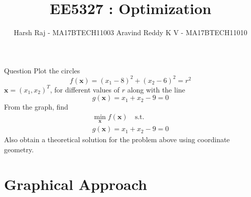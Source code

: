 \documentclass[10pt]{beamer}
\title{EE5327 : Optimization}
\date{}
\author{Harsh Raj - MA17BTECH11003 \newline Aravind Reddy K V - MA17BTECH11010}
\institute{Mathematics and Computing, IIT-Hyderabad}
\begin{document}
\maketitle

\begin{frame}[fragile]{Question}
	Plot the circles 
%
\begin{equation}
\label{eq2_1_circ}
f(\textbf{x}) = (x_1-8)^2 + (x_2-6)^2 = r^2
\end{equation}
%
 $\textbf{x}= (x_1,x_2)^{T}$, for different values of $r$ along with the line 
%
\begin{equation}
\label{eq2_1_line}
g(\textbf{x}) = x_1 + x_2 - 9 = 0
\end{equation} 
%
From the graph, find
\begin{gather*} 
	\min_{\textbf{x}}  f(\textbf{x}) \quad \text{s.t.} \\
	g(\textbf{x}) = x_1 + x_2 - 9 = 0
\end{gather*} 
Also obtain a theoretical solution for the problem above using coordinate geometry.
\end{frame}

\section{Graphical Approach}
\end{document}
